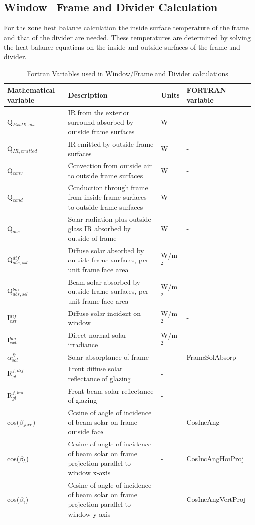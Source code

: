 \subsection{Window~ Frame and Divider Calculation}\label{window-frame-and-divider-calculation}

For the zone heat balance calculation the inside surface temperature of the frame and that of the divider are needed. These temperatures are determined by solving the heat balance equations on the inside and outside surfaces of the frame and divider.

\begin{longtable}[c]{p{1.0in}p{2.5in}p{1.0in}p{1.5in}}
\caption{Fortran Variables used in Window/Frame and Divider calculations \protect \label{table:fortran-variables-used-in-windowframe}}\\
\toprule 
Mathematical variable & Description & Units & FORTRAN \quad variable \tabularnewline \midrule
\endhead
Q\(_{ExtIR,abs}\) & IR from the exterior surround absorbed by outside frame surfaces & W & - \tabularnewline
Q\(_{IR,emitted}\) & IR emitted by outside frame surfaces & W & - \tabularnewline
Q\(_{conv}\) & Convection from outside air to outside frame surfaces & W & - \tabularnewline
Q\(_{cond}\) & Conduction through frame from inside frame surfaces to outside frame surfaces & W & - \tabularnewline
Q\(_{abs}\) & Solar radiation plus outside glass IR absorbed by outside of frame & W & - \tabularnewline
Q\(^{dif}_{abs,sol}\) & Diffuse solar absorbed by outside frame surfaces, per unit frame face area & W/m\(^{2}\) & - \tabularnewline
Q\(^{bm}_{abs,sol}\) & Beam solar absorbed by outside frame surfaces, per unit frame face area & W/m\(^{2}\) & - \tabularnewline
I\(^{dif}_{ext}\) & Diffuse solar incident on window & W/m\(^{2}\) & - \tabularnewline
I\(^{bm}_{ext}\) & Direct normal solar irradiance & W/m\(^{2}\) & - \tabularnewline
$\alpha$\(^{fr}_{sol}\) & Solar absorptance of frame & - & FrameSolAbsorp \tabularnewline
R\(_{gl}^{f,dif}\) & Front diffuse solar reflectance of glazing & - & ~ \tabularnewline
R\(_{gl}^{f,bm}\) & Front beam solar reflectance of glazing & - & ~ \tabularnewline
cos($\beta$\(_{face}\)) & Cosine of angle of incidence of beam solar on frame outside face & ~ & CosIncAng \tabularnewline
cos($\beta$\(_{h}\)) & Cosine of angle of incidence of beam solar on frame projection parallel to window x-axis & - & CosIncAngHorProj \tabularnewline
cos($\beta$\(_{v}\)) & Cosine of angle of incidence of beam solar on frame projection parallel to window y-axis & - & CosIncAngVertProj \tabularnewline

\end{longtable}
